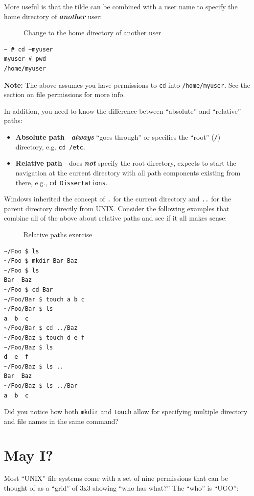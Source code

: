 \documentclass[10pt,]{book}
\numberwithin{figure}{chapter}
\DeclareRobustCommand{\drcap}[1]{\begin{figure}[H]\caption{#1}\end{figure}}
\DeclareRobustCommand{\drcmd}[1]{\index{Commands!#1}}
\begin{document}
More useful is that the tilde can be combined with a user name to
specify the home directory of \textbf{\emph{another}} user:

\drcap{Change to the home directory of another user}

\begin{verbatim}
~ # cd ~myuser
myuser # pwd
/home/myuser
\end{verbatim}

\textbf{Note:} The above assumes you have permissions to \texttt{cd}
into \texttt{/home/myuser}. See the section on file permissions for more
info.

In addition, you need to know the difference between ``absolute'' and
``relative'' paths:

\begin{itemize}
\item
  \textbf{Absolute path} - \textbf{\emph{always}} ``goes through'' or
  specifies the ``root'' (\texttt{/}) directory, e.g. \texttt{cd /etc}.
\item
  \textbf{Relative path} - does \textbf{\emph{not}} specify the root
  directory, expects to start the navigation at the current directory
  with all path components existing from there, e.g.,
  \texttt{cd Dissertations}.
\end{itemize}

Windows inherited the concept of \texttt{.} for the current directory
and \texttt{..} for the parent directory directly from UNIX. Consider
the following examples that combine all of the above about relative
paths and see if it all makes sense:

\drcap{Relative paths exercise}

\begin{verbatim}
~/Foo $ ls
~/Foo $ mkdir Bar Baz
~/Foo $ ls
Bar  Baz
~/Foo $ cd Bar
~/Foo/Bar $ touch a b c
~/Foo/Bar $ ls
a  b  c
~/Foo/Bar $ cd ../Baz
~/Foo/Baz $ touch d e f
~/Foo/Baz $ ls
d  e  f
~/Foo/Baz $ ls ..
Bar  Baz
~/Foo/Baz $ ls ../Bar
a  b  c
\end{verbatim}

Did you notice how both \texttt{mkdir}\drcmd{mkdir} and
\texttt{touch}\drcmd{touch} allow for specifying multiple directory and
file names in the same command?

\section{May I?}\label{may-i}

Most ``UNIX'' file systems come with a set of nine permissions that can
be thought of as a ``grid'' of 3x3 showing ``who has what?'' The ``who''
is ``UGO'':
\end{document}
